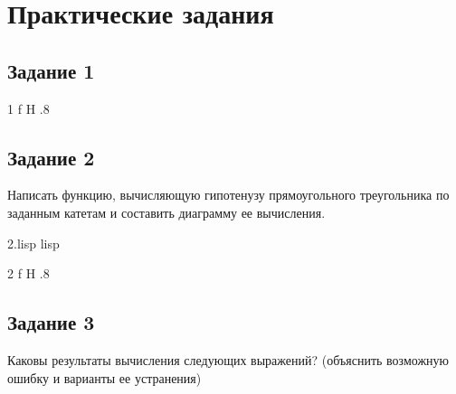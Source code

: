 \chapter{Практические задания}

\section{Задание 1}
{1}
{f}
{H}
{.8\textwidth}
{}

\clearpage

\section{Задание 2}
Написать функцию, вычисляющую гипотенузу прямоугольного треугольника по заданным катетам и составить диаграмму ее вычисления.

{2.lisp}
{lisp}
{}

{2}
{f}
{H}
{.8\textwidth}
{}

\clearpage

\section{Задание 3}
Каковы результаты вычисления следующих выражений? (объяснить возможную ошибку и варианты ее устранения)

